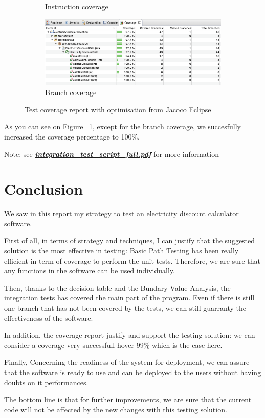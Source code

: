 \documentclass{article}
\begin{document}
\begin{figure}[h!]
\begin{subfigure}[b]{0.4\linewidth}
			\caption{Instruction coverage}
        \end{subfigure}
        \begin{subfigure}[b]{0.4\linewidth}
			\includegraphics[width=\linewidth]{coverage/opti/branch_coverage.png}
			\caption{Branch coverage}
		\end{subfigure}
		\caption{Test coverage report with optimisation from Jacoco Eclipse}
		\label{fig:newcoveragereport}
	\end{figure}

    \bigskip

    As you can see on Figure ~\ref{fig:newcoveragereport}, except for the branch coverage, we succesfully increased the coverage percentage to 100\%.

    \bigskip

    Note: see \underline{\textbf{\textit{integration\_test\_script\_full.pdf}}} for more information

    \section{Conclusion}

    We saw in this report my strategy to test an electricity discount calculator software. 
    
    First of all, in terms of strategy and techniques, I can justify that the suggested solution is the most effective in testing: Basic Path Testing has been
    really efficient in term of coverage to perform the unit tests. Therefore, we are sure that any functions in the software can be used individually.

    Then, thanks to the decision table and the Bundary Value Analysis, the integration tests has covered the main part of the program.
    Even if there is still one branch that has not been covered by the tests, we can still guarranty the effectiveness of the software. 
    
    In addition, the coverage report justify and support the testing solution: we can consider a coverage very successfull hover 99\% which is the case here.

    Finally, Concerning the readiness of the system for deployment, we can assure that the software is ready to use and can be deployed to the users without having doubts on it
    performances. 
    
    The bottom line is that for further improvements, we are sure that the current code will not be affected by the new changes with this testing solution.
 
\end{document}
